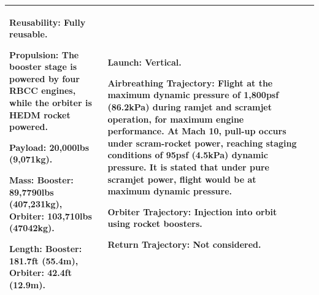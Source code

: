 {\begin{landscape}
\begin{xltabular}{\linewidth}{|X|X|X|}
	\textbf{Reusability:} Fully reusable. 
	
	\textbf{Propulsion:} The booster stage is powered by four RBCC engines, while the orbiter is HEDM rocket powered. 
	
	\textbf{Payload:} 20,000lbs (9,071kg).
	
	\textbf{Mass:} Booster: 89,7790lbs (407,231kg), Orbiter: 103,710lbs (47042kg).  
	
	\textbf{Length:} Booster: 181.7ft (55.4m), Orbiter: 42.4ft (12.9m).
	&\small
	
	\textbf{Launch:} Vertical.
	
	\textbf{Airbreathing Trajectory:} Flight at the maximum dynamic pressure of 1,800psf (86.2kPa) during ramjet and scramjet operation, for maximum engine performance. 
	At Mach 10, pull-up occurs under scram-rocket power, reaching staging conditions of 95psf (4.5kPa) dynamic pressure. It is stated that under pure scramjet power, flight would be at maximum dynamic pressure. 
	
	\textbf{Orbiter Trajectory:} Injection into orbit using rocket boosters. 
	
	
\textbf{Return Trajectory:} Not considered. 
	\\
\hline 
\end{xltabular} 


\end{landscape}
}
\noindent
